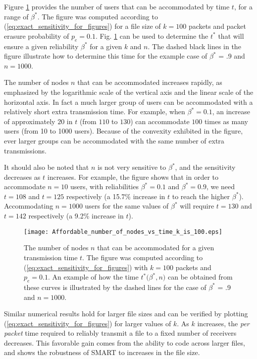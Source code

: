 Figure \ref{fig:accomodated_nodes_for_a_given_t_k_100} provides the number of users that can be accommodated by time $t$, for a range of $\beta^{*}$. The figure was computed according to (\ref{eq:exact_sensitivity_for_figures}) for a file size of $k = 100$ packets and packet erasure probability of $p_{e} = 0.1$. Fig. \ref{fig:accomodated_nodes_for_a_given_t_k_100} can be used to determine the $t^{*}$ that will ensure a given reliability $\beta^{*}$ for a given $k$ and $n$. The dashed black lines in the figure illustrate how to determine this time for the example case of $\beta^{*}$ = .9 and $n = 1000$.

The number of nodes $n$ that can be accommodated increases rapidly, as emphasized by the logarithmic scale of the vertical axis and the linear scale of the horizontal axis. In fact a much larger group of users can be accommodated with a relatively short extra transmission time. For example, when $\beta^{*} = 0.1$, an increase of approximately $20$ in $t$ (from $110$ to $130$) can accommodate $100$ times as many users (from 10 to 1000 users). Because of the convexity exhibited in the figure, ever larger groups can be accommodated with the same number of extra transmissions. 

It should also be noted that $n$ is not very sensitive to $\beta^{*}$, and the sensitivity decreases as $t$ increases. For example, the figure shows that in order to accommodate $n = 10$ users, with reliabilities $\beta^{*} = 0.1$ and $\beta^{*} = 0.9$, we need $t = 108$ and $t = 125$ respectively (a 15.7\% increase in $t$ to reach the higher $\beta^{*}$). Accommodating $n = 1000$ users for the same values of $\beta^{*}$ will require $t = 130$ and $t = 142$ respectively (a 9.2\% increase in $t$). 
\begin{figure} [ht]
\centering
\texttt{[image: Affordable\_number\_of\_nodes\_vs\_time\_k\_is\_100.eps]}
\vspace{-0.8cm}
\caption{The number of nodes $n$ that can be accommodated for a given transmission time $t$. The figure was computed according to (\ref{eq:exact_sensitivity_for_figures}) with $k=100$ packets and $p_{e} = 0.1$. An example of how the time $t^{*}\big(\beta^{*},n\big)$ can be obtained from these curves is illustrated by the dashed lines for the case of $\beta^{*}$ = .9 and $n = 1000$.}
\label{fig:accomodated_nodes_for_a_given_t_k_100}
\end{figure}

Similar numerical results hold for larger file sizes and can be verified by plotting (\ref{eq:exact_sensitivity_for_figures}) for larger values of $k$. As $k$ increases, the \textit{per packet} time required to reliably transmit a file to a fixed number of receivers decreases. This favorable gain comes from the ability to code across larger files, and shows the robustness of SMART to increases in the file size. 



